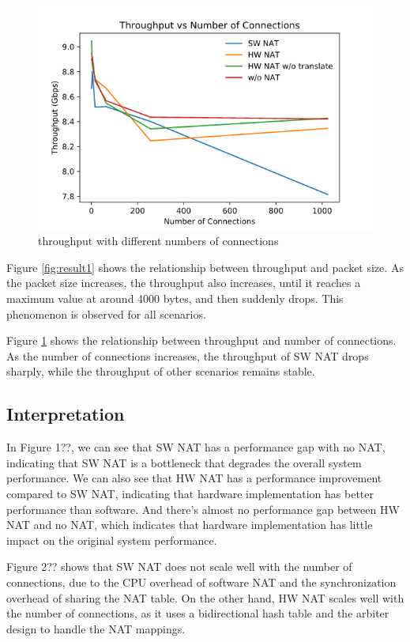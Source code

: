 \begin{figure}[ht]
    \includegraphics[width=\linewidth]{images/Result2.png}
    \caption{throughput with different numbers of connections}
    \label{fig:result2}
\end{figure}

Figure \ref{fig:result1} shows the relationship between throughput and packet size. As the packet size increases, the throughput also increases, until it reaches a maximum value at around 4000 bytes, and then suddenly drops. This phenomenon is observed for all scenarios.

Figure \ref{fig:result2} shows the relationship between throughput and number of connections. As the number of connections increases, the throughput of SW NAT drops sharply, while the throughput of other scenarios remains stable. 

\subsection{Interpretation}

In Figure 1??, we can see that SW NAT has a performance gap with no NAT, indicating that SW NAT is a bottleneck that degrades the overall system performance. We can also see that HW NAT has a performance improvement compared to SW NAT, indicating that hardware implementation has better performance than software. And there's almost no performance gap between HW NAT and no NAT, which indicates that hardware implementation has little impact on the original system performance.

Figure 2?? shows that SW NAT does not scale well with the number of connections, due to the CPU overhead of software NAT and the synchronization overhead of sharing the NAT table. On the other hand, HW NAT scales well with the number of connections, as it uses a bidirectional hash table and the arbiter design to handle the NAT mappings.

